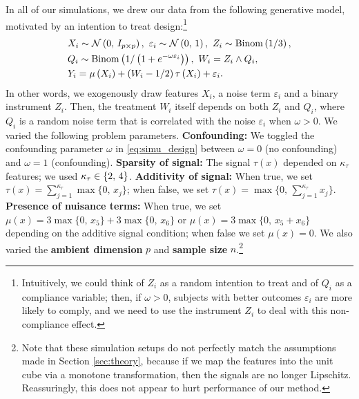 \documentclass[aos]{imsart}
\theoremstyle{plain}
\theoremstyle{definition}
\theoremstyle{remark}
\begin{document}
\begin{CJK}{UTF8}{gbsn}
{\begin{appendix}
In all of our simulations, we drew our data from the following generative model, motivated
by an intention to treat design:\footnote{Intuitively, we could think of $Z_i$ as a random intention
to treat and of $Q_i$ as a compliance variable; then, if $\omega > 0$, subjects with better
outcomes $\varepsilon_i$ are more likely to comply, and we need to use the instrument $Z_i$
to deal with this non-compliance effect.}
\begin{equation}
\label{eq:simu_design}
\begin{split}
&X_i \sim \nn\p{0, \, I_{p \times p}}, \ \varepsilon_i \sim \nn\p{0, \, 1}, \
Z_i \sim \operatorname{Binom}\p{1/3}, \\
&Q_i \sim \operatorname{Binom}\p{1/\p{1 + e^{- \omega \varepsilon_i}}}, \
W_i = Z_i \land Q_i, \\
&Y_i = \mu\p{X_i} + \p{W_i - 1/2} \tau\p{X_i} + \varepsilon_i.
\end{split}
\end{equation}
In other words, we exogenously draw features $X_i$, a noise term $\varepsilon_i$ and a
binary instrument $Z_i$. Then, the treatment $W_i$ itself depends on both $Z_i$ and $Q_i$,
where $Q_i$ is a random noise term that is correlated with the noise $\varepsilon_i$ when
$\omega > 0$.
We varied the following problem parameters.
{\bf Confounding:} We toggled the confounding parameter $\omega$
in \eqref{eq:simu_design} between $\omega = 0$ (no confounding) and $\omega = 1$
(confounding). {\bf Sparsity of signal:} The signal $\tau(x)$ depended on $\kappa_\tau$
features; we used $\kappa_\tau \in \left\{2, \, 4\right\}$. {\bf Additivity of signal:} When true, we set
$\tau(x) = \sum_{j = 1}^{\kappa_\tau} \max\{0, \, x_j\}$; when false, we set
$\tau(x) = \max\{0, \, \sum_{j = 1}^{\kappa_\tau} x_j\}$.
{\bf Presence of nuisance terms:} When true, we set
$\mu(x) = 3\max\{0, \, x_5\} + 3\max\{0, \, x_6\}$ or
$\mu(x) = 3\max\{0, \, x_5 + x_6\}$ depending on
the additive signal condition; when false we set $\mu(x) = 0$.
We also varied the {\bf ambient dimension} $p$ and {\bf sample size}
$n$.\footnote{Note that these simulation setups do not perfectly match the assumptions
made in Section \ref{sec:theory}, because if we map the features into the unit cube
via a monotone transformation, then the signals are no longer Lipschitz. Reassuringly, this
does not appear to hurt performance of our method.}


\end{appendix}}
\end{CJK}
\end{document}
